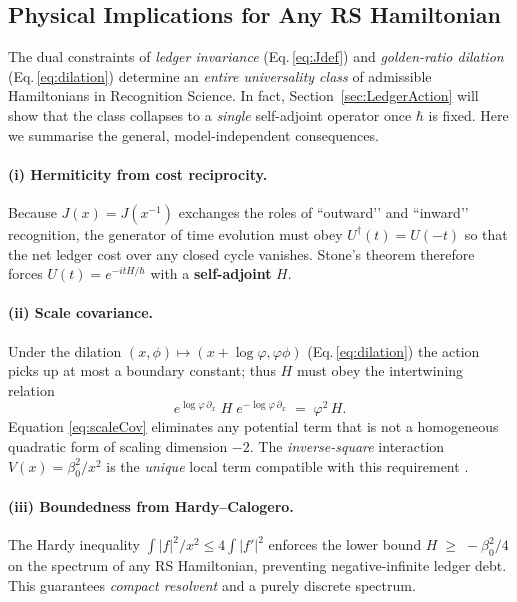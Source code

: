 \documentclass[11pt]{article}
\begin{document}
\subsection{Physical Implications for Any RS Hamiltonian}
\label{sec:PhysImp}

The dual constraints of \emph{ledger invariance}
(Eq.\,\eqref{eq:Jdef}) and \emph{golden-ratio dilation}
(Eq.\,\eqref{eq:dilation}) determine an
\emph{entire universality class} of admissible Hamiltonians in
Recognition Science.  In fact, Section~\ref{sec:LedgerAction} will show
that the class collapses to a \emph{single} self-adjoint operator once
$\hbar$ is fixed.  Here we summarise the general, model-independent
consequences.

\paragraph{(i) Hermiticity from cost reciprocity.}
Because $J(x)=J(x^{-1})$ exchanges the roles of
“outward’’ and “inward’’ recognition, the generator of time evolution
must obey
$
   U^{\dagger}(t)=U(-t)
$
so that the net ledger cost over any closed cycle vanishes.  Stone’s
theorem therefore forces
$
   U(t)=e^{-itH/\hbar}
$
with a \textbf{self-adjoint} $H$.

\paragraph{(ii) Scale covariance.}
Under the dilation $(x,\phi)\!\mapsto\!(x+\log\varphi,\varphi\phi)$
(Eq.\,\eqref{eq:dilation}) the action picks up at most a boundary
constant; thus $H$ must obey the intertwining relation
\begin{equation}
\label{eq:scaleCov}
   e^{\log\varphi\,\partial_{x}}\;H\;
   e^{-\log\varphi\,\partial_{x}}
   \;=\;
   \varphi^{2}\,H.
\end{equation}
Equation \eqref{eq:scaleCov} eliminates any potential term that is not
a homogeneous quadratic form of scaling dimension $-2$.  The
\emph{inverse-square} interaction
$
   V(x)=\beta_{0}^{2}/x^{2}
$
is the \emph{unique} local term compatible with this requirement
\cite[Lem.\,2]{WashburnLedgerUniqueness2025}.

\paragraph{(iii) Boundedness from Hardy--Calogero.}
The Hardy inequality
$
   \int\!|f|^{2}/x^{2}\le4\int\!|f'|^{2}
$
enforces the lower bound
$
   H \;\ge\; -\beta_{0}^{2}/4
$
on the spectrum of any RS Hamiltonian, preventing negative-infinite
ledger debt.  This guarantees \emph{compact resolvent} and a purely
discrete spectrum.
\end{document}
